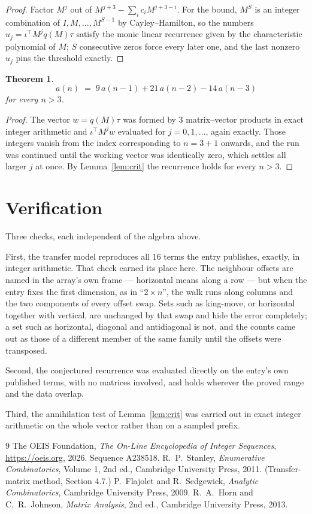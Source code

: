 \documentclass[11pt,a4paper]{article}
\theoremstyle{plain}
\newtheorem{theorem}{Theorem}
\theoremstyle{definition}
\begin{document}
\begin{proof}
Factor $M^{j}$ out of $M^{j+3}-\sum_ic_iM^{j+3-i}$. For the bound, $M^{S}$
is an integer combination of $I,M,\dots,M^{S-1}$ by Cayley--Hamilton, so the numbers
$u_j=\iota^{\!\top}M^{j}q(M)\tau$ satisfy the monic linear recurrence given by the
characteristic polynomial of $M$; $S$ consecutive zeros force every later one, and the last
nonzero $u_j$ pins the threshold exactly.
\end{proof}

\begin{theorem}
\[
a(n)\;=\;9\,a(n-1) + 21\,a(n-2) - 14\,a(n-3)
\]
for every $n>3$.
\end{theorem}

\begin{proof}
The vector $w=q(M)\tau$ was formed by $3$ matrix--vector products in exact integer
arithmetic and $\iota^{\!\top}M^{j}w$ evaluated for $j=0,1,\dots$, again exactly. Those
integers vanish from the index corresponding to $n=3+1$ onwards, and the run was
continued until the working vector was identically zero, which settles all larger $j$ at once.
By Lemma~\ref{lem:crit} the recurrence holds for every $n>3$.
\end{proof}

\section{Verification}

Three checks, each independent of the algebra above.

First, the transfer model reproduces all $16$ terms the entry publishes, exactly, in
integer arithmetic. That check earned its place here. The neighbour offsets are named in the
array's own frame --- horizontal means along a row --- but when the entry fixes the first
dimension, as in ``$2\times n$'', the walk runs along columns and the two components of every
offset swap. Sets such as king-move, or horizontal together with vertical, are unchanged by
that swap and hide the error completely; a set such as horizontal, diagonal and antidiagonal
is not, and the counts came out as those of a different member of the same family until the
offsets were transposed.

Second, the conjectured recurrence was evaluated directly on the entry's own published terms,
with no matrices involved, and holds wherever the proved range and the data overlap.

Third, the annihilation test of Lemma~\ref{lem:crit} was carried out in exact integer
arithmetic on the whole vector rather than on a sampled prefix.

\begin{thebibliography}{9}
 The OEIS Foundation, \emph{The On-Line Encyclopedia of Integer
Sequences}, \url{https://oeis.org}, 2026. Sequence A238518.
 R.~P.~Stanley, \emph{Enumerative Combinatorics}, Volume 1, 2nd ed.,
Cambridge University Press, 2011. (Transfer-matrix method, Section 4.7.)
 P.~Flajolet and R.~Sedgewick, \emph{Analytic Combinatorics}, Cambridge
University Press, 2009.
 R.~A.~Horn and C.~R.~Johnson, \emph{Matrix Analysis}, 2nd ed., Cambridge
University Press, 2013.
\end{thebibliography}
\end{document}
